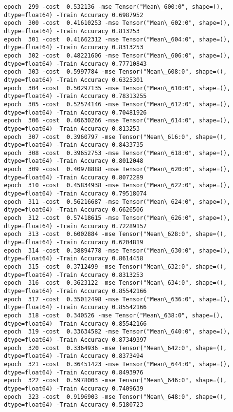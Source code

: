 \documentclass[11pt]{article}
\begin{document}
\begin{Verbatim}[commandchars=\\\{\}]
epoch  299 -cost  0.532136 -mse Tensor("Mean\_600:0", shape=(), dtype=float64) -Train Accuracy 0.6987952
epoch  300 -cost  0.41610253 -mse Tensor("Mean\_602:0", shape=(), dtype=float64) -Train Accuracy 0.813253
epoch  301 -cost  0.41662312 -mse Tensor("Mean\_604:0", shape=(), dtype=float64) -Train Accuracy 0.8313253
epoch  302 -cost  0.48221606 -mse Tensor("Mean\_606:0", shape=(), dtype=float64) -Train Accuracy 0.77710843
epoch  303 -cost  0.5997784 -mse Tensor("Mean\_608:0", shape=(), dtype=float64) -Train Accuracy 0.6325301
epoch  304 -cost  0.50297135 -mse Tensor("Mean\_610:0", shape=(), dtype=float64) -Train Accuracy 0.78313255
epoch  305 -cost  0.52574146 -mse Tensor("Mean\_612:0", shape=(), dtype=float64) -Train Accuracy 0.70481926
epoch  306 -cost  0.40630266 -mse Tensor("Mean\_614:0", shape=(), dtype=float64) -Train Accuracy 0.813253
epoch  307 -cost  0.3960797 -mse Tensor("Mean\_616:0", shape=(), dtype=float64) -Train Accuracy 0.8433735
epoch  308 -cost  0.39652753 -mse Tensor("Mean\_618:0", shape=(), dtype=float64) -Train Accuracy 0.8012048
epoch  309 -cost  0.40978888 -mse Tensor("Mean\_620:0", shape=(), dtype=float64) -Train Accuracy 0.8072289
epoch  310 -cost  0.45834938 -mse Tensor("Mean\_622:0", shape=(), dtype=float64) -Train Accuracy 0.79518074
epoch  311 -cost  0.56216687 -mse Tensor("Mean\_624:0", shape=(), dtype=float64) -Train Accuracy 0.6626506
epoch  312 -cost  0.57418615 -mse Tensor("Mean\_626:0", shape=(), dtype=float64) -Train Accuracy 0.72289157
epoch  313 -cost  0.6002884 -mse Tensor("Mean\_628:0", shape=(), dtype=float64) -Train Accuracy 0.6204819
epoch  314 -cost  0.38894778 -mse Tensor("Mean\_630:0", shape=(), dtype=float64) -Train Accuracy 0.8614458
epoch  315 -cost  0.3712499 -mse Tensor("Mean\_632:0", shape=(), dtype=float64) -Train Accuracy 0.8313253
epoch  316 -cost  0.3623122 -mse Tensor("Mean\_634:0", shape=(), dtype=float64) -Train Accuracy 0.85542166
epoch  317 -cost  0.35012498 -mse Tensor("Mean\_636:0", shape=(), dtype=float64) -Train Accuracy 0.85542166
epoch  318 -cost  0.340526 -mse Tensor("Mean\_638:0", shape=(), dtype=float64) -Train Accuracy 0.85542166
epoch  319 -cost  0.33634582 -mse Tensor("Mean\_640:0", shape=(), dtype=float64) -Train Accuracy 0.87349397
epoch  320 -cost  0.3364936 -mse Tensor("Mean\_642:0", shape=(), dtype=float64) -Train Accuracy 0.8373494
epoch  321 -cost  0.36451423 -mse Tensor("Mean\_644:0", shape=(), dtype=float64) -Train Accuracy 0.8493976
epoch  322 -cost  0.5978003 -mse Tensor("Mean\_646:0", shape=(), dtype=float64) -Train Accuracy 0.7409639
epoch  323 -cost  0.9196903 -mse Tensor("Mean\_648:0", shape=(), dtype=float64) -Train Accuracy 0.5180723

\end{Verbatim}
\end{document}
